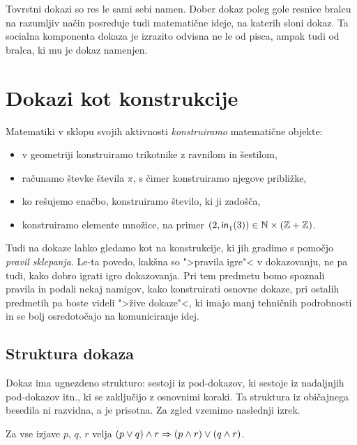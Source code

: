 Tovrstni dokazi so res le sami sebi namen.
%
Dober dokaz poleg gole resnice bralcu na razumljiv način posreduje tudi matematične ideje, na katerih sloni dokaz.
%
Ta socialna komponenta dokaza je izrazito odvisna ne le od pisca, ampak tudi od bralca, ki mu je dokaz namenjen.
%



\section{Dokazi kot konstrukcije}

Matematiki v sklopu svojih aktivnosti \emph{konstruiramo} matematične objekte:
%
\begin{itemize}
\item v geometriji konstruiramo trikotnike z ravnilom in šestilom,
\item računamo števke števila $\pi$, s čimer konstruiramo njegove približke,
\item ko rešujemo enačbo, konstruiramo število, ki ji zadošča,
\item konstruiramo elemente množice, na primer $(2, \inl(3)) \in \NN \times (\ZZ + \ZZ)$.
\end{itemize}
%
Tudi na dokaze lahko gledamo kot na konstrukcije, ki jih gradimo s pomočjo \emph{pravil sklepanja}.
%
Le-ta povedo, kakšna so ">pravila igre"< v dokazovanju, ne pa tudi, kako dobro igrati igro dokazovanja.
%
Pri tem predmetu bomo spoznali pravila in podali nekaj namigov, kako konstruirati osnovne dokaze, pri ostalih predmetih pa boste videli ">žive dokaze"<, ki imajo manj tehničnih podrobnosti in se bolj
osredotočajo na komuniciranje idej.


\subsection{Struktura dokaza}
\label{sec:struktura-dokaza}

Dokaz ima ugnezdeno strukturo: sestoji iz pod-dokazov, ki sestoje iz nadaljnjih pod-dokazov itn., ki se zaključijo z osnovnimi koraki. Ta struktura iz običajnega besedila ni razvidna, a je prisotna. Za zgled vzemimo naslednji izrek.

\begin{izrek}
  \label{izrek:pqr}%
  Za vse izjave $p$, $q$, $r$ velja
  $(p \lor q) \land r \Rightarrow (p \land r) \lor (q \land r)$.
\end{izrek}


